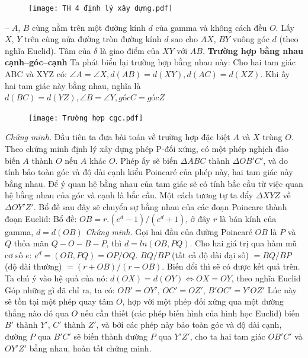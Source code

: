 \begin{multicols}{2}
	\begin{figure}[H]
		\vspace*{-5pt}
		\centering
		\captionsetup{labelformat= empty, justification=centering}
		\texttt{[image: TH 4 định lý xây dựng.pdf]}
		\vspace*{-10pt}
	\end{figure}
	-- $A$, $B$ cùng nằm trên một đường kính $d$ của gamma và không cách đều $O$. Lấy $X$, $Y$ trên cùng nửa đường tròn đường kính $d$ sao cho $AX$, $BY$ vuông góc $d$ (theo nghĩa Euclid). Tâm của $\delta$ là giao điểm của $XY$ với $AB$.
	\vskip 0.1cm
	\textbf{\color{lichsutoanhoc}Trường hợp bằng nhau cạnh--góc--cạnh}
	\vskip 0.1cm
	Ta phát biểu lại trường hợp bằng nhau này:
	Cho hai tam giác ABC và XYZ có: $ \angle A = \angle X, d(AB) = d(XY), d(AC) = d(XZ)$.
	Khi ấy hai tam giác này bằng nhau, nghĩa là $d(BC)  = d(YZ), \angle B = \angle Y, góc C = góc Z$
	\begin{figure}[H]
		\vspace*{-5pt}
		\centering
		\captionsetup{labelformat= empty, justification=centering}
		\texttt{[image: Trường hợp cgc.pdf]}
		\vspace*{-10pt}
	\end{figure}
	\textit{Chứng minh.} Đầu tiên ta đưa bài toán về trường hợp đặc biệt $A$ và $X$ trùng $O$.
	Theo chứng minh định lý xây dựng phép P-đối xứng, có một phép nghịch đảo biến $A$ thành $O$ nếu $A$ khác $O$. Phép ấy sẽ biến $\Delta ABC$ thành $\Delta OB'C'$, và do tính bảo toàn góc và độ dài cạnh kiểu Poincaré của phép này, hai tam giác này bằng nhau. Để ý quan hệ bằng nhau của tam giác sẽ có tính bắc cầu từ việc quan hệ bằng nhau của góc và cạnh là bắc cầu. Một cách tương tự ta đẩy $\Delta XYZ$ về $ \Delta OY'Z'$.
	\vskip 0.1cm
	Bổ đề sau đây sẽ chuyển sự bằng nhau của các đoạn Poincare thành đoạn Euclid:
	\vskip 0.1cm
	Bổ đề: $OB = r.(e^d -1)/(e^d+1)$, ở đây $r$ là bán kính của gamma, $d = d(OB)$
	\vskip 0.1cm
	\textit{Chứng minh.} Gọi hai đầu của đường Poincaré $OB$ là $P$ và $Q$ thỏa mãn $Q - O - B - P$, thì $d = ln(OB, PQ)$.
	Cho hai giá trị qua hàm mũ cơ số $e$:
	$e^d = (OB, PQ) = OP/OQ$. $BQ/BP$ (tất cả độ dài đại số) $= BQ/BP$ (độ dài thường) $= (r + OB)/(r-OB)$.
	Biến đổi thì sẽ có được kết quả trên.
	Ta chú ý vào hệ quả của nó: $d(OX) = d(OY) \Leftrightarrow OX = OY$, theo nghĩa Euclid
	\vskip 0.1cm
	Góp những gì đã chỉ ra, ta có: $OB' = OY'$, $OC' = OZ'$, $B'OC' = Y'OZ'$
	\vskip 0.1cm
	Lúc này sẽ tồn tại một phép quay tâm $O$, hợp với một phép đối xứng qua một đường thẳng nào đó qua $O$ nếu cần thiết (các phép biến hình của hình học Euclid) biến $B'$ thành $Y'$, $C'$ thành $Z'$, và bởi các phép này bảo toàn góc và độ dài cạnh, đường $P$ qua $B'C'$ sẽ biến thành đường $P$ qua $Y'Z'$, cho ta hai tam giác $OB'C'$ và $OY'Z'$ bằng nhau, hoàn tất chứng minh.

\end{multicols}
